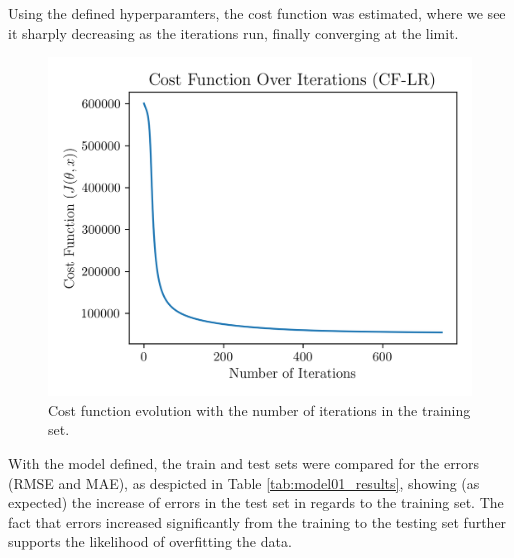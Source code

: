 \documentclass[conference]{IEEEtran}
\begin{document}


Using the defined hyperparamters, the cost function was estimated, where we see it sharply decreasing as the iterations run, finally converging at the limit.



\begin{figure}[H]
    \centering
    \includegraphics[width=1\linewidth]{assets/model01_cost_function.png}
    \caption{Cost function evolution with the number of iterations in the training set.}
    \label{fig:model01_cost_function}
\end{figure}

With the model defined, the train and test sets were compared for the errors (RMSE and MAE), as despicted in Table \ref{tab:model01_results}, showing (as expected) the increase of errors in the test set in regards to the training set. The fact that errors increased significantly from the training to the testing set further supports the likelihood of overfitting the data.
\end{document}
